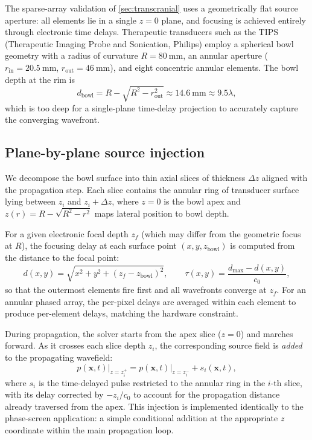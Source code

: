 \documentclass[11pt]{article}
\begin{document}
The sparse-array validation of \cref{sec:transcranial} uses a
geometrically flat source aperture: all elements lie in a single
$z = 0$ plane, and focusing is achieved entirely through electronic
time delays.  Therapeutic transducers such as the TIPS (Therapeutic
Imaging Probe and Sonication, Philips) employ a spherical bowl
geometry with a radius of curvature $R = \SI{80}{\milli\meter}$, an
annular aperture ($r_{\mathrm{in}} = \SI{20.5}{\milli\meter}$,
$r_{\mathrm{out}} = \SI{46}{\milli\meter}$), and eight concentric
annular elements.  The bowl depth at the rim is
\begin{equation}
  d_{\mathrm{bowl}} = R - \sqrt{R^2 - r_{\mathrm{out}}^2}
  \approx \SI{14.6}{\milli\meter} \approx 9.5\lambda,
\end{equation}
which is too deep for a single-plane time-delay projection to
accurately capture the converging wavefront.

\subsection{Plane-by-plane source injection}
\label{sec:bowl:injection}

We decompose the bowl surface into thin axial slices of thickness
$\Delta z$ aligned with the propagation step.  Each slice contains the
annular ring of transducer surface lying between $z_i$ and
$z_i + \Delta z$, where $z = 0$ is the bowl apex and
$z(r) = R - \sqrt{R^2 - r^2}$ maps lateral position to bowl depth.

For a given electronic focal depth $z_f$ (which may differ from the
geometric focus at $R$), the focusing delay at each surface point
$(x, y, z_{\mathrm{bowl}})$ is computed from the distance to the
focal point:
\begin{equation}
  d(x,y) = \sqrt{x^2 + y^2 + (z_f - z_{\mathrm{bowl}})^2},
  \qquad
  \tau(x,y) = \frac{d_{\max} - d(x,y)}{c_0},
  \label{eq:bowl_delay}
\end{equation}
so that the outermost elements fire first and all wavefronts converge
at $z_f$.  For an annular phased array, the per-pixel delays are
averaged within each element to produce per-element delays, matching
the hardware constraint.

During propagation, the solver starts from the apex slice
($z = 0$) and marches forward.  As it crosses each slice depth $z_i$,
the corresponding source field is \emph{added} to the propagating
wavefield:
\begin{equation}
  p(\mathbf{x}, t)\big|_{z = z_i^+}
  = p(\mathbf{x}, t)\big|_{z = z_i^-}
  + s_i(\mathbf{x}, t),
\end{equation}
where $s_i$ is the time-delayed pulse restricted to the annular ring
in the $i$-th slice, with its delay corrected by $-z_i/c_0$ to account
for the propagation distance already traversed from the apex.  This
injection is implemented identically to the phase-screen application:
a simple conditional addition at the appropriate $z$ coordinate within
the main propagation loop.
\end{document}

